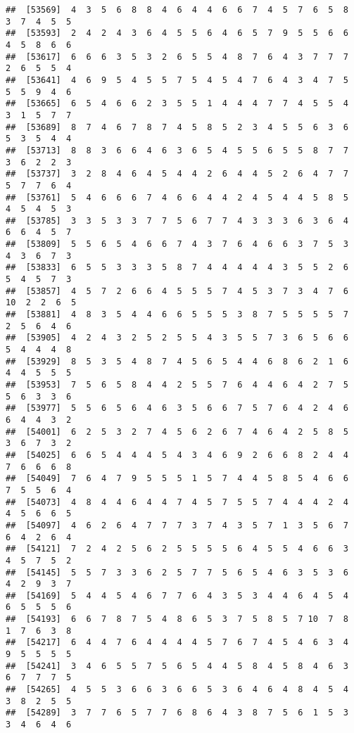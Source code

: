 \documentclass[
]{book}
\begin{document}
\begin{verbatim}
##  [53569]  4  3  5  6  8  8  4  6  4  4  6  6  7  4  5  7  6  5  8  3  7  4  5  5
##  [53593]  2  4  2  4  3  6  4  5  5  6  4  6  5  7  9  5  5  6  6  4  5  8  6  6
##  [53617]  6  6  6  3  5  3  2  6  5  5  4  8  7  6  4  3  7  7  7  2  6  5  5  4
##  [53641]  4  6  9  5  4  5  5  7  5  4  5  4  7  6  4  3  4  7  5  5  5  9  4  6
##  [53665]  6  5  4  6  6  2  3  5  5  1  4  4  4  7  7  4  5  5  4  3  1  5  7  7
##  [53689]  8  7  4  6  7  8  7  4  5  8  5  2  3  4  5  5  6  3  6  5  3  5  4  4
##  [53713]  8  8  3  6  6  4  6  3  6  5  4  5  5  6  5  5  8  7  7  3  6  2  2  3
##  [53737]  3  2  8  4  6  4  5  4  4  2  6  4  4  5  2  6  4  7  7  5  7  7  6  4
##  [53761]  5  4  6  6  6  7  4  6  6  4  4  2  4  5  4  4  5  8  5  4  5  4  5  3
##  [53785]  3  3  5  3  3  7  7  5  6  7  7  4  3  3  3  6  3  6  4  6  6  4  5  7
##  [53809]  5  5  6  5  4  6  6  7  4  3  7  6  4  6  6  3  7  5  3  4  3  6  7  3
##  [53833]  6  5  5  3  3  3  5  8  7  4  4  4  4  4  3  5  5  2  6  5  4  5  7  3
##  [53857]  4  5  7  2  6  6  4  5  5  5  7  4  5  3  7  3  4  7  6 10  2  2  6  5
##  [53881]  4  8  3  5  4  4  6  6  5  5  5  3  8  7  5  5  5  5  7  2  5  6  4  6
##  [53905]  4  2  4  3  2  5  2  5  5  4  3  5  5  7  3  6  5  6  6  5  4  4  4  8
##  [53929]  8  5  3  5  4  8  7  4  5  6  5  4  4  6  8  6  2  1  6  4  4  5  5  5
##  [53953]  7  5  6  5  8  4  4  2  5  5  7  6  4  4  6  4  2  7  5  5  6  3  3  6
##  [53977]  5  5  6  5  6  4  6  3  5  6  6  7  5  7  6  4  2  4  6  6  4  4  3  2
##  [54001]  6  2  5  3  2  7  4  5  6  2  6  7  4  6  4  2  5  8  5  3  6  7  3  2
##  [54025]  6  6  5  4  4  4  5  4  3  4  6  9  2  6  6  8  2  4  4  7  6  6  6  8
##  [54049]  7  6  4  7  9  5  5  5  1  5  7  4  4  5  8  5  4  6  6  7  5  5  6  4
##  [54073]  4  8  4  4  6  4  4  7  4  5  7  5  5  7  4  4  4  2  4  4  5  6  6  5
##  [54097]  4  6  2  6  4  7  7  7  3  7  4  3  5  7  1  3  5  6  7  6  4  2  6  4
##  [54121]  7  2  4  2  5  6  2  5  5  5  5  6  4  5  5  4  6  6  3  4  5  7  5  2
##  [54145]  5  5  7  3  3  6  2  5  7  7  5  6  5  4  6  3  5  3  6  4  2  9  3  7
##  [54169]  5  4  4  5  4  6  7  7  6  4  3  5  3  4  4  6  4  5  4  6  5  5  5  6
##  [54193]  6  6  7  8  7  5  4  8  6  5  3  7  5  8  5  7 10  7  8  1  7  6  3  8
##  [54217]  6  4  4  7  6  4  4  4  4  5  7  6  7  4  5  4  6  3  4  9  5  5  5  5
##  [54241]  3  4  6  5  5  7  5  6  5  4  4  5  8  4  5  8  4  6  3  6  7  7  7  5
##  [54265]  4  5  5  3  6  6  3  6  6  5  3  6  4  6  4  8  4  5  4  3  8  2  5  5
##  [54289]  3  7  7  6  5  7  7  6  8  6  4  3  8  7  5  6  1  5  3  3  4  6  4  6

\end{verbatim}
\end{document}
